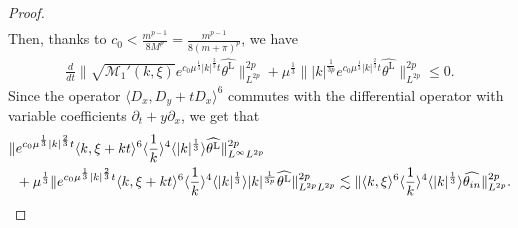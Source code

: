 \documentclass[10pt,a4paper]{amsart}
\begin{document}
\begin{proof}
\begin{align*}
		\end{align*}
		Then, thanks to $c_0 < \frac{m^{p-1}}{8M^p} = \frac{m^{p-1}}{8(m+\pi)^p}$, we have 
		\begin{align} \label{eq:est of theta L}
			\frac{d}{dt} \| \sqrt{\mathcal{M}_1'(k, \xi)}   e^{c_0 \mu^\frac13 |k|^\frac23 t} \widehat{\theta^{\mathrm{L}} } \|_{L^{2p}}^{2p}  +  \mu^\frac13 \| |k|^\frac{1}{3p} e^{c_0 \mu^\frac13 |k|^\frac23 t} \widehat{\theta^{\mathrm{L}} }\|_{L^{2p}}^{2p} \leq 0.
		\end{align}
		Since the operator $\langle D_x, D_y + tD_x\rangle^6$ commutes with the differential operator with variable coefficients $\partial_t+y \partial_x$, we get that
		\begin{equation}\begin{aligned} \label{eq:est of linear theta L2}
				\|  &e^{c_0 \mu^\frac13 |k|^\frac23 t} \langle k, \xi + kt\rangle^6 \langle \frac{1}{k}\rangle^4 \langle |k|^\frac13 \rangle \widehat{\theta^{\mathrm{L}}} \|_{L^\infty L^{2p}}^{2p} \\
				&+ \mu^\frac13 \| e^{ c_0 \mu^\frac13 |k|^\frac23 t}    \langle k, \xi + kt\rangle^6 \langle \frac{1}{k}\rangle^4 \langle |k|^\frac13 \rangle |k|^\frac{1}{3p} \widehat{\theta^{\mathrm{L}}} \|_{L^{2p} L^{2p}}^{2p} \lesssim \|  \langle k, \xi\rangle^6 \langle \frac{1}{k}\rangle^4 \langle |k|^\frac13 \rangle \widehat{\theta_{\rm in}} \|_{L^{2p}}^{2p} . 
		\end{aligned}\end{equation}

\end{proof}
\end{document}
